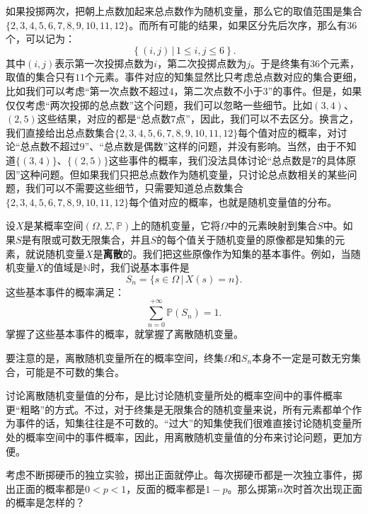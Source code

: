 \documentclass[12pt,UTF8]{ctexbook}
\begin{document}
如果投掷两次，把朝上点数加起来总点数作为随机变量，那么它的取值范围是集合$\{2,3,4,5,6,7,8,9,10,11,12\}$。而所有可能的结果，如果区分先后次序，那么有$36$个，可以记为：
$$ \left\{(i,j) \, | \, 1\leqslant i, j \leqslant 6\right\}. $$
其中$(i,j)$表示第一次投掷点数为$i$，第二次投掷点数为$j$。于是终集有$36$个元素，取值的集合只有$11$个元素。事件对应的知集显然比只考虑总点数对应的集合更细，比如我们可以考虑“第一次点数不超过$4$，第二次点数不小于$3$”的事件。但是，如果仅仅考虑“两次投掷的总点数”这个问题，我们可以忽略一些细节。比如$(3,4)$、$(2,5)$这些结果，对应的都是“总点数$7$点”，因此，我们可以不去区分。换言之，我们直接给出总点数集合$\{2,3,4,5,6,7,8,9,10,11,12\}$每个值对应的概率，对讨论“总点数不超过$9$”、“总点数是偶数”这样的问题，并没有影响。当然，由于不知道$\{(3,4)\}$、$\{(2,5)\}$这些事件的概率，我们没法具体讨论“总点数是$7$的具体原因”这种问题。但如果我们只把总点数作为随机变量，只讨论总点数相关的某些问题，我们可以不需要这些细节，只需要知道总点数集合$\{2,3,4,5,6,7,8,9,10,11,12\}$每个值对应的概率，也就是随机变量值的分布。

设$X$是某概率空间$(\Omega, \Sigma, \mathbb{P})$上的随机变量，它将$\Omega$中的元素映射到集合$S$中。如果$S$是有限或可数无限集合，并且$S$的每个值关于随机变量的原像都是知集的元素，就说随机变量$X$是\textbf{离散}的。我们把这些原像作为知集的基本事件。例如，当随机变量$X$的值域是$\mathbb{N}$时，我们说基本事件是
$$S_n =\{s \in \Omega \, | \, X(s) = n\}.$$
这些基本事件的概率满足：
$$ \sum_{n=0}^{+\infty} \mathbb{P}(S_n) = 1. $$
掌握了这些基本事件的概率，就掌握了离散随机变量。

要注意的是，离散随机变量所在的概率空间，终集$\Omega$和$S_n$本身不一定是可数无穷集合，可能是不可数的集合。

讨论离散随机变量值的分布，是比讨论随机变量所处的概率空间中的事件概率更“粗略”的方式。不过，对于终集是无限集合的随机变量来说，所有元素都单个作为事件的话，知集往往是不可数的。“过大”的知集使我们很难直接讨论随机变量所处的概率空间中的事件概率，因此，用离散随机变量值的分布来讨论问题，更加方便。

\begin{ex}
    考虑不断掷硬币的独立实验，掷出正面就停止。每次掷硬币都是一次独立事件，掷出正面的概率都是$0<p<1$，反面的概率都是$1-p$。那么掷第$n$次时首次出现正面的概率是怎样的？
\end{ex}
\end{document}
